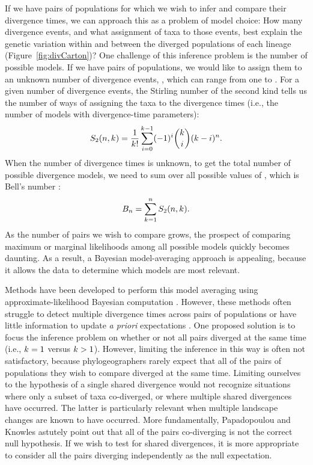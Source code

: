 \begin{linenomath}
If we have pairs of populations for which we wish to infer and compare their
divergence times, we can approach this as a problem of model choice:
How many divergence events, and what assignment of taxa to those events, best
explain the genetic variation within and between the diverged populations of
each lineage (Figure~\ref{fig:divCarton})?
One challenge of this inference problem is the number of possible models.
If we have \ncomparisons pairs of populations, we would like to assign them to an
unknown number of divergence events, \nevents, which can range from one to
\ncomparisons.
For a given number of divergence events, the Stirling number of the second kind
tells us the number of ways of assigning the taxa to the divergence times
(i.e., the number of models with \nevents divergence-time parameters):
\begin{equation}
    S_2(n, k_{}) = 
    \frac{1}{k_{}!} \sum_{i = 0}^{k_{} - 1} (-1)^{i}
    \binom{k_{}}{i} (k_{} - i)^{n}.
    \label{eq:stirling2}
\end{equation}
When the number of divergence times is unknown, to get the total number of
possible divergence models, we need to sum over all possible values of
\nevents, which is Bell's number \citep{Bell1934}:
\begin{equation}
    B_{n} = \sum_{k_{} = 1}^{n}
    S_2(n, k_{}).
    \label{eq:bell}
\end{equation}
As the number of pairs we wish to compare grows, the prospect of comparing
maximum or marginal likelihoods among all possible models quickly becomes
daunting.
As a result, a Bayesian model-averaging approach is appealing, because it
allows the data to determine which models are most relevant.
\end{linenomath}

Methods have been developed to perform this model averaging using
approximate-likelihood Bayesian computation
\citep{Hickerson2006,Huang2011,Oaks2014dpp}.
However, these methods often struggle to detect multiple divergence times
across pairs of populations \citep{Oaks2012, Oaks2014reply} or have little
information to update \emph{a priori} expectations \citep{Oaks2014dpp}.
One proposed solution is to focus the inference problem on whether or not all
pairs diverged at the same time (i.e., $k_{} = 1$ versus
$k_{} > 1$)\citep{Hickerson2013}.
However, limiting the inference in this way is often not satisfactory, because
phylogeographers rarely expect that all of the pairs of populations they wish
to compare diverged at the same time.
Limiting ourselves to the hypothesis of a single shared divergence would not
recognize situations where only a subset of taxa co-diverged, or where multiple
shared divergences have occurred.
The latter is particularly relevant when multiple landscape changes are known
to have occurred.
More fundamentally, Papadopoulou and Knowles \citeyear{Papadopoulou2016}
astutely point out that all of the pairs co-diverging is not the correct null
hypothesis.
If we wish to test for shared divergences, it is more appropriate to consider
all the pairs diverging independently as the null expectation.

